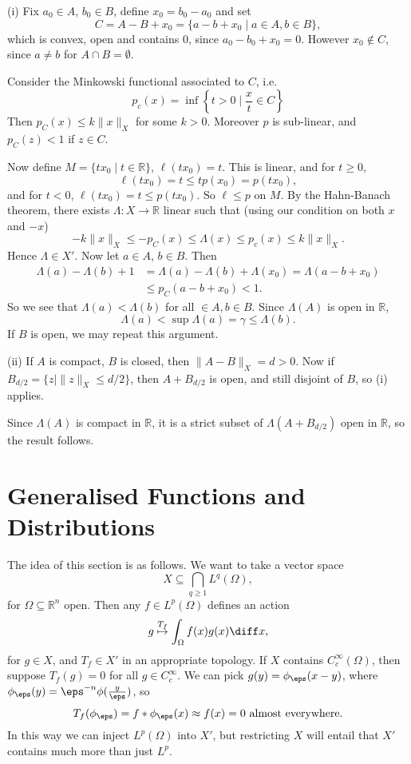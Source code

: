 \documentclass[12pt]{article}
\begin{document}
\begin{proofbox}
	

	(i) Fix $a_0 \in A$, $b_0 \in B$, define $x_0 = b_0 - a_0$ and set
	\[
		C = A - B + x_0 = \{a - b + x_0 \mid a \in A, b \in B\},
	\]
	which is convex, open and contains $0$, since $a_0 - b_0 + x_0 = 0$. However $x_0 \not \in C$, since $a \neq b$ for $A \cap B = \emptyset$.

	Consider the Minkowski functional associated to $C$, i.e.
	\[
		p_c(x) = \inf \left\{t > 0 \mid \frac{x}{t} \in C \right\}
	\]
	Then $p_C(x) \leq k \|x\|_X$ for some $k > 0$. Moreover $p$ is sub-linear, and $p_C(z) < 1$ if $z \in C$.

	Now define $M = \{t x_0 \mid t \in \mathbb{R}\}$, $\ell(t x_0) = t$. This is linear, and for $t \geq 0$,
	\[
	\ell(t x_0) = t \leq t p(x_0) = p(tx_0),
	\]
	and for $t < 0$, $\ell(t x_0) = t \leq p(t x_0)$. So $\ell \leq p$ on $M$. By the Hahn-Banach theorem, there exists $\Lambda : X \to \mathbb{R}$ linear such that (using our condition on both $x$ and $-x$)
	\[
	- k \|x\|_X \leq - p_C(x) \leq \Lambda(x) \leq p_c(x) \leq k \|x\|_X.
	\]
	Hence $\Lambda \in X'$. Now let $a \in A$, $b \in B$. Then
	\begin{align*}
		\Lambda(a) - \Lambda(b) + 1 &= \Lambda(a) - \Lambda(b) + \Lambda(x_0) = \Lambda(a - b + x_0) \\
					    &\leq p_C(a - b + x_0) < 1.
	\end{align*}
	So we see that $\Lambda(a) < \Lambda(b)$ for all $ \in A, b \in B$. Since $\Lambda(A)$ is open in $\mathbb{R}$,
	\[
	\Lambda(a) < \sup \Lambda(a) = \gamma \leq \Lambda(b).
	\]
	If $B$ is open, we may repeat this argument.

	(ii) If $A$ is compact, $B$ is closed, then $\|A - B\|_X = d > 0$. Now if $B_{d/2} = \{z \mid \|z\|_X \leq d/2\}$, then $A + B_{d/2}$ is open, and still disjoint of $B$, so (i) applies.

	Since $\Lambda(A)$ is compact in $\mathbb{R}$, it is a strict subset of $\Lambda(A + B_{d/2})$ open in $\mathbb{R}$, so the result follows.
\end{proofbox}


\newpage

\section{Generalised Functions and Distributions}
\label{sec:gf_dist}

The idea of this section is as follows. We want to take a vector space
\[
X \subseteq \bigcap_{q \geq 1} L^q(\Omega),
\]
for $\Omega \subseteq \mathbb{R}^n$ open. Then any $f \in L^p(\Omega)$ defines an action
\[
	g \overset{T_f}{\mapsto} \int_{\Omega} f(x) g(x) \diff x,
\]
for $g \in X$, and $T_f \in X'$ in an appropriate topology. If $X$ contains $C_c^{\infty}(\Omega)$, then suppose $T_f(g) = 0$ for all $g \in C_c^\infty$. We can pick $g(y) = \phi_\eps (x - y)$, where $\phi_\eps(y) = \eps^{-n} \phi(\frac{y}{\eps})$, so
\[
	T_f(\phi_\eps) = f \ast \phi_\eps(x) \approx f(x) = 0 \text{ almost everywhere}.
\]
In this way we can inject $L^p(\Omega)$ into $X'$, but restricting $X$ will entail that $X'$ contains much more than just $L^p$.
\end{document}
